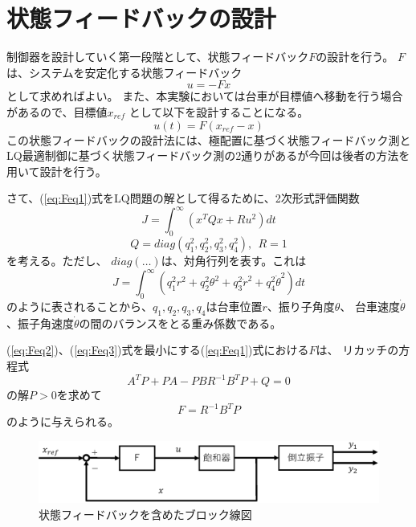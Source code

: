 \section{状態フィードバックの設計}
	制御器を設計していく第一段階として、状態フィードバック$F$の設計を行う。
	$F$は、システムを安定化する状態フィードバック
	\[
		u = -Fx
	\]
	として求めればよい。
	また、本実験においては台車が目標値へ移動を行う場合があるので、目標値$x_{ref}$
	として以下を設計することになる。
	\begin{equation}
		u(t) = F(x_{ref} - x)
		\label{eq:Feq1}
	\end{equation}
	この状態フィードバックの設計法には、極配置に基づく状態フィードバック測と
	LQ最適制御に基づく状態フィードバック測の2通りがあるが今回は後者の方法を用いて設計を行う。
	\par
	さて、(\ref{eq:Feq1})式をLQ問題の解として得るために、2次形式評価関数
	\begin{equation}
		J = \int_{0}^{\infty}(x^{T}Qx+Ru^{2})dt
		\label{eq:Feq2}
	\end{equation}
	\begin{equation}
		Q = diag(q_{1}^2,q_{2}^2,q_{3}^2,q_{4}^2),\ \ R = 1
		\label{eq:Feq3}
	\end{equation}
	を考える。ただし、 $diag(\ldots)$は、対角行列を表す。これは
	\begin{equation}
		J=\int_{0}^{\infty}(q_{1}^{2}r^{2}+q_{2}^{2}\theta^{2}
		+q_{3}^{2}\dot{r}^{2}+q_{4}^{2}\dot{\theta}^{2})dt
	\end{equation}
	のように表されることから、$q_1,q_2,q_3,q_4$は台車位置$r$、振り子角度$\theta$、
	台車速度$\dot{\theta}$、振子角速度$\dot{\theta}$の間のバランスをとる重み係数である。
	\par
	(\ref{eq:Feq2})、(\ref{eq:Feq3})式を最小にする(\ref{eq:Feq1})式における$F$は、
	リカッチの方程式
	\[
		A^{T}P+PA-PBR^{-1}B^{T}P+Q = 0
	\]
	の解$P>0$を求めて
	\[
		F = R^{-1}B^{T}P
	\]
	のように与えられる。
	\begin{figure}[h]
		\centering
		\includegraphics[width=0.8\linewidth]{gazo/controll_F.eps}
		\caption{状態フィードバックを含めたブロック線図}
		\label{image:cF}
	\end{figure}


